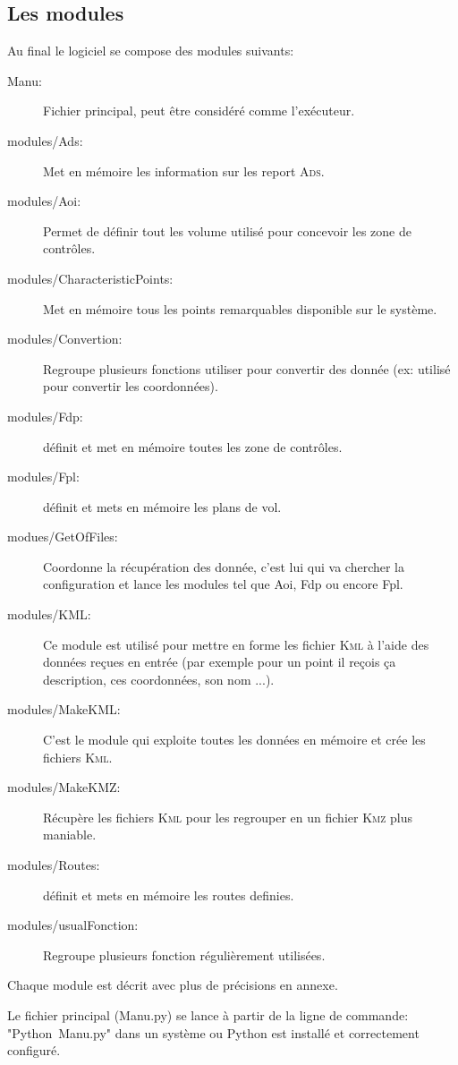     \subsection{Les modules}
Au final le logiciel se compose des modules suivants:
\begin{description}
\item[Manu:] Fichier principal, peut être considéré comme l'exécuteur. 
\item[modules/Ads:] Met en mémoire les information sur les report \textsc{Ads}. 
\item[modules/Aoi:] Permet de définir tout les volume utilisé pour concevoir les zone de contrôles. 
\item[modules/CharacteristicPoints:] Met en mémoire tous les points remarquables disponible sur le système. 
\item[modules/Convertion:] Regroupe plusieurs fonctions utiliser pour convertir des donnée (ex: utilisé pour convertir les coordonnées). 
\item[modules/Fdp:] définit et met en mémoire toutes les zone de contrôles. 
\item[modules/Fpl:] définit et mets en mémoire les plans de vol. 
\item[modues/GetOfFiles:] Coordonne la récupération des donnée, c'est lui qui va chercher la configuration et lance les modules tel que Aoi, Fdp ou encore Fpl. 
\item[modules/KML:] Ce module est utilisé pour mettre en forme les fichier \textsc{Kml} à l'aide des données reçues en entrée (par exemple pour un point il reçois ça description, ces coordonnées, son nom ...). 
\item[modules/MakeKML:] C'est le module qui exploite toutes les données en mémoire et crée les fichiers \textsc{Kml}. 
\item[modules/MakeKMZ:] Récupère les fichiers \textsc{Kml} pour les regrouper en un fichier \textsc{Kmz} plus maniable. 
\item[modules/Routes:] définit et mets en mémoire les routes definies. 
\item[modules/usualFonction:] Regroupe plusieurs fonction régulièrement utilisées. 
\end{description}
Chaque module est décrit avec plus de précisions en annexe.

Le fichier principal (Manu.py) se lance à partir de la ligne de commande: "Python~Manu.py" dans un système ou Python est installé et correctement configuré.

